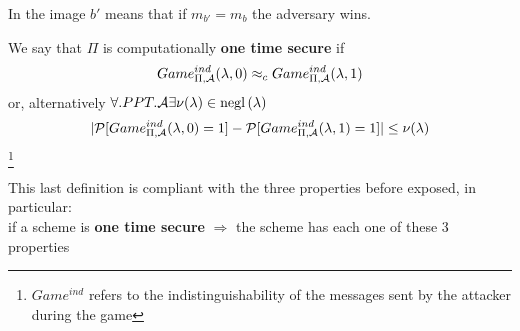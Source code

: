 In the image \label{fig:knowmess} $b'$ means that if $m_{b'}=m_{b}$ the
adversary wins.
\begin{definition}
    We say that $\Pi$ is computationally \textbf{one time secure }  if 
    \[
        Game_{\Pi, \mathcal{A}}^{ind}(\lambda, 0) \approx_{c} Game_{\Pi, \mathcal{A}}
        ^{ind}(\lambda,1)
    \]  
    or, alternatively $ \forall.PPT.\mathcal{A} \exists \nu(\lambda) \in \mathrm{negl}\left({\lambda}\right)$
    \[
        | \mathcal{P} [ Game_{\Pi, \mathcal{A}}^{ind}(\lambda, 0)=1 ] - \mathcal{P} [ Game_{\Pi,
        \mathcal{A}}^{ind}(\lambda, 1)=1 ]   |   \leq  \nu(\lambda) 
    \]\footnote{$Game^{ind}$ refers to the indistinguishability of the messages
sent by the attacker during the game}
\end{definition}



This last definition is compliant with the three properties before exposed, in
particular:\\

if a scheme is \textbf{one time secure} $\Rightarrow$ the scheme has
each one of these 3 properties

